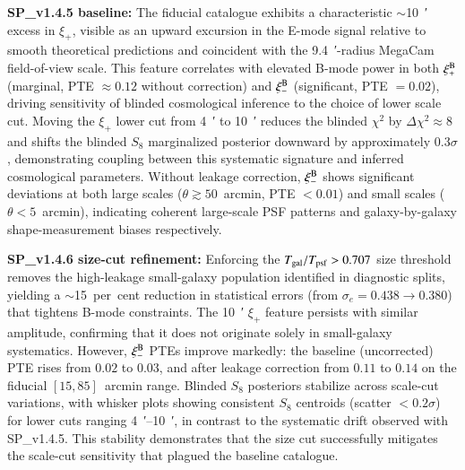 \documentclass{aa}
\begin{document}
\textbf{SP\_v1.4.5 baseline:} The fiducial catalogue exhibits a characteristic $\sim$\SI{10}{\arcmin} excess in $\xi_+$, visible as an upward excursion in the E-mode signal relative to smooth theoretical predictions and coincident with the \SI{9.4}{\arcmin}-radius MegaCam field-of-view scale. This feature correlates with elevated B-mode power in both $\xi_+^{\rm B}$ (marginal, PTE $\approx 0.12$ without correction) and $\xi_-^{\rm B}$ (significant, PTE $= 0.02$), driving sensitivity of blinded cosmological inference to the choice of lower scale cut. Moving the $\xi_+$ lower cut from \SI{4}{\arcmin} to \SI{10}{\arcmin} reduces the blinded $\chi^2$ by $\Delta\chi^2 \approx 8$ and shifts the blinded $S_8$ marginalized posterior downward by approximately \num{0.3}$\sigma$, demonstrating coupling between this systematic signature and inferred cosmological parameters. Without leakage correction, $\xi_-^{\rm B}$ shows significant deviations at both large scales ($\theta \gtrsim 50$~arcmin, PTE $< 0.01$) and small scales ($\theta < 5$~arcmin), indicating coherent large-scale PSF patterns and galaxy-by-galaxy shape-measurement biases respectively.

\textbf{SP\_v1.4.6 size-cut refinement:} Enforcing the $T_{\rm gal}/T_{\rm psf} > 0.707$ size threshold removes the high-leakage small-galaxy population identified in diagnostic splits, yielding a $\sim$\num{15}~per~cent reduction in statistical errors (from $\sigma_e = 0.438 \to 0.380$) that tightens B-mode constraints. The \SI{10}{\arcmin} $\xi_+$ feature persists with similar amplitude, confirming that it does not originate solely in small-galaxy systematics. However, $\xi_-^{\rm B}$ PTEs improve markedly: the baseline (uncorrected) PTE rises from $0.02$ to $0.03$, and after leakage correction from $0.11$ to $0.14$ on the fiducial $[15, 85]$~arcmin range. Blinded $S_8$ posteriors stabilize across scale-cut variations, with whisker plots showing consistent $S_8$ centroids (scatter $< 0.2\sigma$) for lower cuts ranging \SIrange{4}{10}{\arcmin}, in contrast to the systematic drift observed with SP\_v1.4.5. This stability demonstrates that the size cut successfully mitigates the scale-cut sensitivity that plagued the baseline catalogue.
\end{document}
